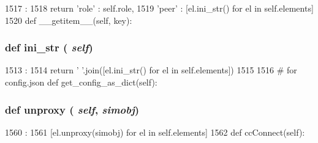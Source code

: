 \begin{DoxyCode}
1517                                 :
1518         return {'role' : self.role,
1519                 'peer' : [el.ini_str() for el in self.elements]}
1520 
    def __getitem__(self, key):
\end{DoxyCode}
\hypertarget{classm5_1_1params_1_1VectorPortRef_a33ebe6cd32bcbd15465fc28b9d94bf82}{
\subsubsection[{ini\_\-str}]{\setlength{\rightskip}{0pt plus 5cm}def ini\_\-str ( {\em self})}}
\label{classm5_1_1params_1_1VectorPortRef_a33ebe6cd32bcbd15465fc28b9d94bf82}



\begin{DoxyCode}
1513                      :
1514         return ' '.join([el.ini_str() for el in self.elements])
1515 
1516     # for config.json
    def get_config_as_dict(self):
\end{DoxyCode}
\hypertarget{classm5_1_1params_1_1VectorPortRef_a587cd3c1e899640dc09d63793aa8093b}{
\subsubsection[{unproxy}]{\setlength{\rightskip}{0pt plus 5cm}def unproxy ( {\em self}, \/   {\em simobj})}}
\label{classm5_1_1params_1_1VectorPortRef_a587cd3c1e899640dc09d63793aa8093b}



\begin{DoxyCode}
1560                              :
1561         [el.unproxy(simobj) for el in self.elements]
1562 
    def ccConnect(self):
\end{DoxyCode}


